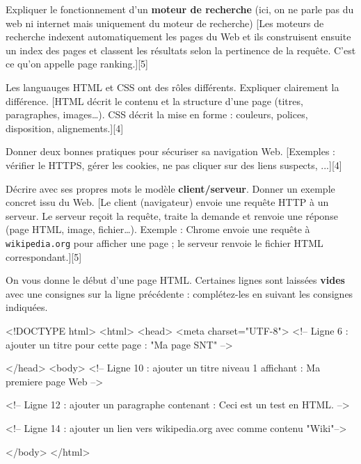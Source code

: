 \documentclass[11pt]{article}
\begin{document}
	\begin{qcm}
		
		\begin{qcmfreequestion}{Expliquer le fonctionnement d'un \textbf{moteur de recherche} (ici, on ne parle pas du web ni internet mais uniquement du moteur de recherche)}  
			[Les moteurs de recherche indexent automatiquement les pages du Web et ils construisent ensuite un index des pages et classent les résultats selon la pertinence de la requête. C’est ce qu’on appelle page ranking.][5]
		\end{qcmfreequestion}
		
		\begin{qcmfreequestion}{Les languauges HTML et CSS ont des rôles différents. Expliquer clairement la différence.}
			[HTML décrit le contenu et la structure d’une page (titres, paragraphes, images…).  
			CSS décrit la mise en forme : couleurs, polices, disposition, alignements.][4]
		\end{qcmfreequestion}
		
		\begin{qcmfreequestion}{Donner deux bonnes pratiques pour sécuriser sa navigation Web.}
			[Exemples : vérifier le HTTPS, gérer les cookies, ne pas cliquer sur des liens suspects, ...][4]
		\end{qcmfreequestion}
		
		\begin{qcmfreequestion}{Décrire avec ses propres mots le modèle \textbf{client/serveur}. 		Donner un exemple concret issu du Web.}
			[Le client (navigateur) envoie une requête HTTP à un serveur.  
			Le serveur reçoit la requête, traite la demande et renvoie une réponse (page HTML, image, fichier…).  
			Exemple : Chrome envoie une requête à \texttt{wikipedia.org} pour afficher une page ; le serveur renvoie le fichier HTML correspondant.][5]
		\end{qcmfreequestion}
		
	\end{qcm}
	
	\newpage
		
		On vous donne le début d'une page HTML.  
		Certaines lignes sont laissées \textbf{vides} avec une consignes sur la ligne précédente : complétez-les en suivant les consignes indiquées.
		
			
		\begin{html}
	<!DOCTYPE html>
	<html>
			<head>
					<meta charset="UTF-8">
					<!-- Ligne 6 : ajouter un titre pour cette page : "Ma page SNT" -->
			
			</head>
			<body>
					<!-- Ligne 10 : ajouter un titre niveau 1 affichant : Ma premiere page Web -->
					
					<!-- Ligne 12 : ajouter un paragraphe contenant : Ceci est un test en HTML. -->
					
					<!-- Ligne 14 : ajouter un lien vers wikipedia.org avec comme contenu "Wiki"-->
					
			</body>
	</html>\end{html}
		
\end{document}
